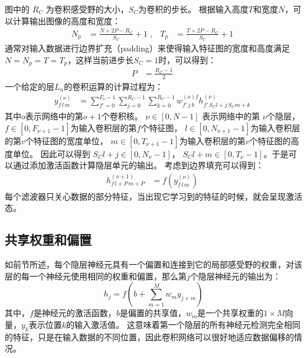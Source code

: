 图中的 $R_C$ 为卷积感受野的大小，$S_C$为卷积的步长。
根据输入高度$ T $和宽度$ N $，可以计算输出图像的高度和宽度：
\begin{align}
  N_p&=\frac{N+2P-R_C}{S_C}+1 \;,&
  T_p&=\frac{T+2P-R_C}{S_C}+1\;
\end{align}
通常对输入数据进行边界扩充（padding）来使得输入特征图的宽度和高度满足$ N = N_p = T = T_p $，这样当前进步长$ S_C = 1 $时，可以得到：
\begin{align}
P&=\frac{R_C-1}{2}\;
\end{align}
一个给定的层$ L_n $的卷积运算的计算过程为：
\begin{align}
y_{f\,l\,m}^{(\nu)}&=\sum^{F_\nu-1}_{f'=0}\sum^{R_C-1}_{j=0}\sum^{R_C-1}_{k=0}
w^{(o)f}_{f'\,j\,k}h^{(\nu)}_{f'\,S_Cl+j\,S_Cm+k}\;
\end{align}
其中$ o $表示网络中的第$ o + 1 $个卷积核。
$\nu \in [0,N-1 ]$ 表示网络中的第 $\nu$个隐层，$f\in[0,F_{\nu+1}-1]$为输入卷积层的第$f$个特征图， $l\in[0,N_{\nu+1}-1 ]$为输入卷积层的第$v$个特征图的宽度单位， $m\in[0,T_{\nu+1}-1 ]$为输入卷积层的第$v$个特征图的高度单位。 因此可以得到 $S_Cl+j\in[0,N_\nu-1 ]$， $S_Cl+m\in[0,T_\nu-1 ]$。于是可以通过添加激活函数计算隐层单元的输出。
考虑到边界填充可以得到：
\begin{align}
h_{f\,l+P\,m+P}^{(\nu+1)}&=f\left(y_{f\,l\,m}^{(\nu)}\right)\;
\end{align}
每个滤波器只关心数据的部分特征，当出现它学习到的特征的时候，就会呈现激活态。

\subsection{共享权重和偏置}
如前节所述，每个隐层神经元具有一个偏置和连接到它的局部感受野的权重，对该层的每一个神经元使用相同的权重和偏置，那么第$j$个隐层神经元的输出为：
\begin{equation}
  h_j = f(b+\sum_{m=1}^M w_m y_{j+m})
  \label{equ:shared_weight}
\end{equation}
其中，$f$是神经元的激活函数，$b$是偏置的共享值，$w_m$是一个共享权重的$1\times M$向量，$y_k$表示位置$k$的输入激活值。
这意味着第一个隐层的所有神经元检测完全相同的特征，只是在输入数据的不同位置，因此卷积网络可以很好地适应数据偏移的情况。

